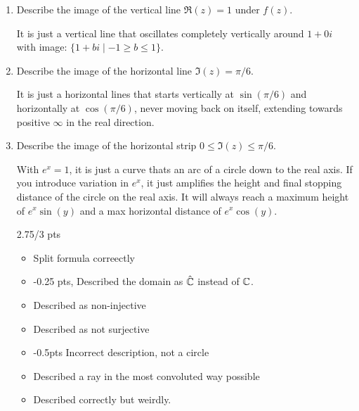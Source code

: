 \begin{enumerate}
\begin{enumerate}
\begin{proof}
		\end{proof}
		\item Describe the image of the vertical line $\Re(z) = 1$ under $f(z)$. 
		\begin{problem}
			It is just a vertical line that oscillates completely vertically around ${1 + 0i}$ with image: $\{1+bi\mid -1\ge b\le 1\}$.
		\end{problem}
		\item Describe the image of the horizontal line $\Im(z) = \pi/6$.
		\begin{problem}
			It is just a horizontal lines that starts vertically at $\sin(\pi/6)$ and horizontally at $\cos(\pi/6)$, never moving back on itself, extending towards positive $\infty$ in the real direction. 
		\end{problem}
		\item Describe the image of the horizontal strip $0 \leq \Im(z) \leq \pi/6$.
		\begin{problem}
			With $e^x = 1$, it is just a curve thats an arc of a circle down to the real axis. If you introduce variation in $e^x$, it just amplifies the height and final stopping distance of the circle on the real axis. It will always reach a maximum height of $e^x\sin(y)$ and a max horizontal distance of $e^x\cos(y)$. 	
		\end{problem}
		\begin{grade}
			2.75/3 pts
			\begin{itemize}[itemsep=0pt, parsep=0pt]
				\item Split formula correectly
				\item -0.25 pts, Described the domain as $\hat{\mathbb{C}}$ instead of $\mathbb{C}$. 
				\item Described as non-injective
				\item Described as not surjective
				\item -0.5pts Incorrect description, not a circle
				\item Described a ray in the most convoluted way possible
				\item Described correctly but weirdly. 
			\end{itemize}
		\end{grade}
	\end{enumerate}
	

\end{enumerate}
